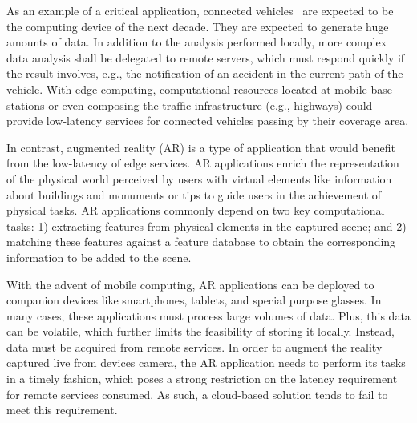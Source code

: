 As an example of a critical application, connected vehicles~\cite{} are expected to be the computing device of the next decade. They are expected to generate huge amounts of data. In addition to the analysis performed locally, more complex data analysis shall be delegated to remote servers, which must respond quickly if the result involves, e.g., the notification of an accident in the current path of the vehicle. With edge computing, computational resources located at mobile base stations or even composing the traffic infrastructure (e.g., highways) could provide low-latency services for connected vehicles passing by their coverage area.

In contrast, augmented reality (AR) is a type of application that would benefit from the low-latency of edge services. AR applications enrich the representation of the physical world perceived by users with virtual elements like information about buildings and monuments or tips to guide users in the achievement of physical tasks. AR applications commonly depend on two key computational tasks: 1) extracting features from physical elements in the captured scene; and 2) matching these features against a feature database to obtain the corresponding information to be added to the scene. 

With the advent of mobile computing, AR applications can be deployed to companion devices like smartphones, tablets, and special purpose glasses. In many cases, these applications must process large volumes of data. Plus, this data can be volatile, which further limits the feasibility of storing it locally. Instead, data must be acquired from remote services. In order to augment the reality captured live from devices camera, the AR application needs to perform its tasks in a timely fashion, which poses a strong restriction on the latency requirement for remote services consumed. As such, a cloud-based solution tends to fail to meet this requirement. 



